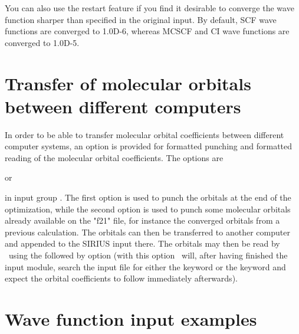 \noindent
You can also use the restart feature if you find it desirable to
converge the wave function sharper
than specified in the original input. By default, SCF wave
functions are converged to 1.0D-6, whereas MCSCF and CI wave
functions are converged to 1.0D-5.

\pagebreak[2]
\section{\label{sec:ig_orbtransfer}
Transfer of molecular orbitals between different computers}

In order to be able to transfer molecular orbital coefficients between
different computer systems,
an option is provided for
formatted punching and formatted reading of the molecular orbital
coefficients.  The options are
\begin{center}
    or 
\end{center}
in input group . The first option is used to
punch the orbitals at the end of the optimization, while the
second option is used to punch some molecular
orbitals already available on the "f21"
 file, for instance the converged
orbitals from a previous calculation.  The orbitals can then be
transferred to another computer and appended to the SIRIUS input
there. The orbitals may then be read by \siraba\ using the
 followed by  option  (with this option
\siraba\ will, after having finished the 
input module, search the input file for either the 
keyword or the  keyword and expect the orbital
coefficients to follow immediately afterwards).


\section{\label{examples} Wave function input examples}

